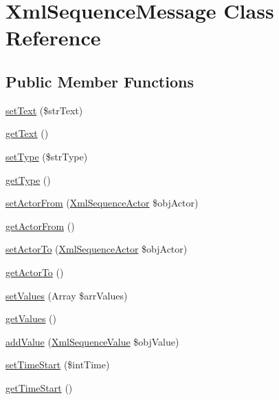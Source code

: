 \hypertarget{class_xml_sequence_message}{
\section{XmlSequenceMessage Class Reference}
\label{class_xml_sequence_message}
}
\subsection*{Public Member Functions}
\begin{CompactItemize}
\item 
\hyperlink{class_xml_sequence_message_26924a5809fc46179731c63cdef4637f}{setText} (\$strText)
\item 
\hyperlink{class_xml_sequence_message_8a2999b1d846c0a7bc77187e28facd99}{getText} ()
\item 
\hyperlink{class_xml_sequence_message_48d409343c54e747174ffaf5911b2cd9}{setType} (\$strType)
\item 
\hyperlink{class_xml_sequence_message_830b5c75df72b32396701bc563fbe3c7}{getType} ()
\item 
\hyperlink{class_xml_sequence_message_e2d39ea366f732a74b73c05ed3d1fbb5}{setActorFrom} (\hyperlink{class_xml_sequence_actor}{XmlSequenceActor} \$objActor)
\item 
\hyperlink{class_xml_sequence_message_246c4363396d243058a9decdba3c7851}{getActorFrom} ()
\item 
\hyperlink{class_xml_sequence_message_92a0fddd1153a2fe01e9715ceb5233c0}{setActorTo} (\hyperlink{class_xml_sequence_actor}{XmlSequenceActor} \$objActor)
\item 
\hyperlink{class_xml_sequence_message_63824a7a88f53de045b4d2d641594e7e}{getActorTo} ()
\item 
\hyperlink{class_xml_sequence_message_18c41e77a9f42da10d074cda0ea308fe}{setValues} (Array \$arrValues)
\item 
\hyperlink{class_xml_sequence_message_70a0fe08035189260c72e32a9e20d30c}{getValues} ()
\item 
\hyperlink{class_xml_sequence_message_ac0ca1155cee0f020e42c4eda522c89e}{addValue} (\hyperlink{class_xml_sequence_value}{XmlSequenceValue} \$objValue)
\item 
\hyperlink{class_xml_sequence_message_60d6f4557ab43800fe80fb113d0ccc1c}{setTimeStart} (\$intTime)
\item 
\hyperlink{class_xml_sequence_message_bb950915c967cab83e55f46db3d44169}{getTimeStart} ()
\item 

\end{CompactItemize}
